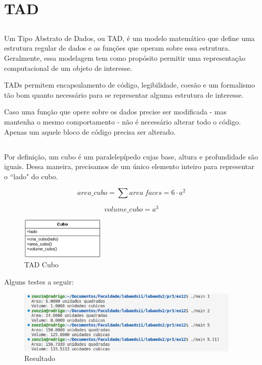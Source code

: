 \section{TAD}
\subsection{}
Um Tipo Abstrato de Dados, ou TAD, é um modelo matemático que define uma estrutura regular de dados e as funções que operam sobre essa estrutura. Geralmente, essa modelagem tem como propósito permitir uma representação computacional de um objeto de interesse. 

TADs permitem encapsulamento de código, legibilidade, coesão e um formalismo tão bom quanto necessário para se representar alguma estrutura de interesse. 

Caso uma função que opere sobre os dados precise ser modificada - mas mantenha o mesmo comportamento - não é necessário alterar todo o código. Apenas um aquele bloco de código precisa ser alterado. 

\subsection{}
Por definição, um cubo é um paralelepípedo cujas base, altura e profundidade são iguais. Dessa maneira, precisamos de um único elemento inteiro para representar o ``lado" do cubo. 

$$area\_cubo = \sum area \ faces = 6\cdot a^2$$

$$volume\_cubo = a^3$$

\begin{figure}[h!]
	\centering
	\includegraphics[width=4cm]{cubo_uml}
	\caption{TAD Cubo}
	\label{fig:cubouml}
\end{figure}





Alguns testes a seguir: 

\begin{figure}[h!]
	\centering
	\includegraphics[height=3cm]{ex12_saida}
	\caption{Resultado}
	\label{fig:ex12saida}
\end{figure}


